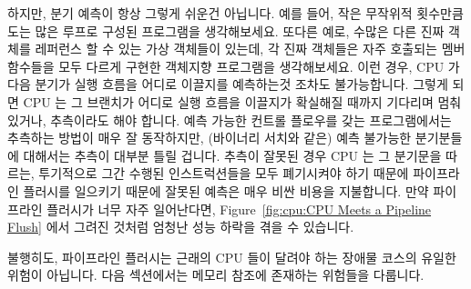 하지만, 분기 예측이 항상 그렇게 쉬운건 아닙니다.
예를 들어, 작은 무작위적 횟수만큼 도는 많은 루프로 구성된 프로그램을
생각해보세요.
또다른 예로, 수많은 다른 진짜 객체를 레퍼런스 할 수 있는 가상 객체들이 있는데,
각 진짜 객체들은 자주 호출되는 멤버 함수들을 모두 다르게 구현한 객체지향
프로그램을 생각해보세요.
이런 경우, CPU 가 다음 분기가 실행 흐름을 어디로 이끌지를 예측하는것 조차도
불가능합니다.
그렇게 되면 CPU 는 그 브랜치가 어디로 실행 흐름을 이끌지가 확실해질 때까지
기다리며 멈춰있거나, 추측이라도 해야 합니다.
예측 가능한 컨트롤 플로우를 갖는 프로그램에서는 추측하는 방법이 매우 잘
동작하지만, (바이너리 서치와 같은) 예측 불가능한 분기분들에 대해서는 추측이
대부분 틀릴 겁니다.
추측이 잘못된 경우 CPU 는 그 분기문을 따르는, 투기적으로 그간 수행된
인스트럭션들을 모두 폐기시켜야 하기 때문에 파이프라인 플러시를 일으키기 때문에
잘못된 예측은 매우 비싼 비용을 지불합니다.
만약 파이프라인 플러시가 너무 자주 일어난다면, Figure~\ref{fig:cpu:CPU Meets a
Pipeline Flush} 에서 그려진 것처럼 엄청난 성능 하락을 겪을 수 있습니다.

불행히도, 파이프라인 플러시는 근래의 CPU 들이 달려야 하는 장애물 코스의 유일한
위험이 아닙니다.
다음 섹션에서는 메모리 참조에 존재하는 위험들을 다룹니다.


